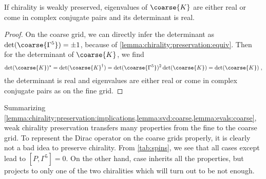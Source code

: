 
\begin{lemma} \label{lemma:evals:coarse}
If chirality is weakly preserved, eigenvalues of $\coarse{K}$ are either real or come in complex conjugate pairs and its determinant is real.
\end{lemma}

\begin{proof}
On the coarse grid, we can directly infer the determinant as $\det(\coarse{\Gamma^{5}}) = \pm 1$, because of \cref{lemma:chirality:preservation:equiv}.
Then for the determinant of $\coarse{K}$, we find
\begin{equation}
\det(\coarse{K})^{\star} =
\det(\coarse{K}^{\dagger}) =
\det(\coarse{\Gamma^{5}})^{2} \det(\coarse{K}) =
\det(\coarse{K}) \;,
\end{equation}
\ie the determinant is real and eigenvalues are either real or come in complex conjugate pairs as on the fine grid.
\end{proof}


Summarizing \cref{lemma:chirality:preservation:implications,lemma:svd:coarse,lemma:evals:coarse}, weak chirality preservation transfers many properties from the fine to the coarse grid.
To represent the Dirac operator on the coarse grids properly, it is clearly not a bad idea to preserve chirality.
From \cref{tab:spins}, we see that all cases except  lead to $[P, \Gamma^{5}]=0$.
On the other hand, case  inherits all the properties, but projects to only one of the two chiralities which will turn out to be not enough.

